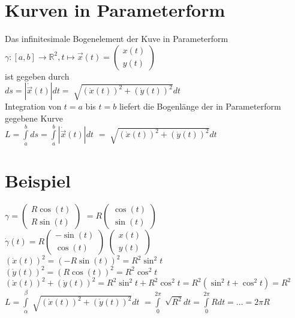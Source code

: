 \documentclass[../main.tex]{subfiles}
\begin{document}
\section{Kurven in Parameterform}
Das infinitesimale Bogenelement der Kuve in Parameterform \\
$\gamma:[a,b]\to\mathbb{R}^2,t\mapsto \vec{x}(t)=
\begin{pmatrix}
    x(t) \\
    y(t)
\end{pmatrix}$ \\ [7pt]
ist gegeben durch \\ [7pt]
$ds=|\dot{\vec{x}}(t)|dt=\sqrt[]{(\dot{x}(t))^2+(\dot{y}(t))^2}dt$ \\ [7pt]
Integration von $t=a$ bis $t=b$ liefert die Bogenlänge der in Parameterform gegebene Kurve \\ [7pt]
$L=\int\limits_a^bds = \int\limits_a^b|\dot{\vec{x}}(t)|dt$
$=\sqrt[]{(\dot{x}(t))^2+(\dot{y}(t))^2}dt$ 

\section{Beispiel}
$\gamma=\begin{pmatrix}R\cos(t) \\R\sin(t)\end{pmatrix}$
$=R\begin{pmatrix}\cos(t) \\\sin(t)\end{pmatrix}$ \\ [7pt]
$\dot{\gamma}(t)=R\begin{pmatrix}-\sin(t) \\\cos(t)\end{pmatrix}$
$\begin{pmatrix}x(t) \\y(t) \end{pmatrix} $ \\ [7pt]
$(\dot{x}(t))^2=(-R\sin(t))^2=R^2\sin^2t$ \\ [7pt]
$(\dot{y}(t))^2=(R\cos(t))^2=R^2\cos^2t$ \\ [7pt]
$(\dot{x}(t))^2+(\dot{y}(t))^2=R^2\sin^2t+R^2\cos^2t=R^2(\sin^2t+\cos^2t)=R^2$ \\ [7pt]
$L=\int\limits_\alpha^\beta\sqrt[]{(\dot{x}(t))^2+(\dot{y}(t))^2}dt$
$=\int\limits_0^{2\pi}\sqrt[]{R^2}dt=\int\limits_0^{2\pi}Rdt=...=2\pi R$
\end{document}

